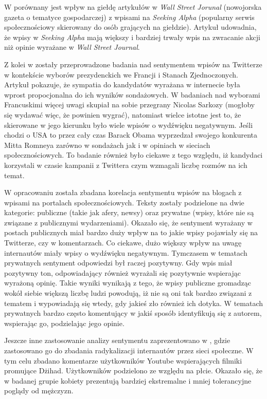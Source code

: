 W \cite{SentimentRevealedInSocialMedia} porównany jest wpływ na giełdę artykułów
w \textit{Wall Street Jorunal} (nowojorska gazeta o tematyce gospodarczej) z
wpisami na \textit{Seeking Alpha} (popularny serwis społecznościowy skierowany
do osób grających na giełdzie). Artykuł udowadnia, że wpisy w \textit{Seeking
Alpha} mają większy i bardziej trwały wpis na zwracanie akcji niż opinie
wyrażane w \textit{Wall Street Journal}.

Z kolei w \cite{PresidentialElectionsOnTwitter} zostały przeprowadzone badania
nad sentymentem wpisów na Twitterze w kontekście wyborów prezydenckich we
Francji i Stanach Zjednoczonych.
Artykuł pokazuje, że sympatia do kandydatów wyrażana w internecie była wprost
propocjonalna do ich wyników sondażowych. W badaniach nad wyborami Francuskimi
więcej uwagi skupiał na sobie przegrany Nicolas Sarkozy (mogłoby się wydawać
więc, że powinien wygrać), natomiast wielce istotne jest to, że skierowane w
jego kierunku było wiele wpisów o wydźwięku negatywnym. Jeśli chodzi o USA to
przez cały czas Barack Obama wyprzedzał swojego konkurenta Mitta Romneya zarówno
w sondażach jak i w opiniach w sieciach społecznościowych. To badanie również
było ciekawe z tego względu, iż kandydaci korzystali w czasie kampanii z
Twittera czym wzmagali liczbę rozmów na ich temat.

W opracowaniu \cite{AnalyzingSentimentialInfluenceOfPosts}
została zbadana korelacja sentymentu wpisów na blogach z wpisami na portalach
społecznościowych. Teksty zostały podzielone na dwie kategorie:
publiczne (takie jak afery, newsy) oraz prywatne (wpisy, które nie są związane z
publicznymi wydarzeniami). Okazało się, że sentyment wyrażany w postach
publicznych miał bardzo duży wpływ na to jakie wpisy pojawiały się na Twitterze,
czy w komentarzach. Co ciekawe, dużo większy wpływ na uwagę internautów miały
wpisy o wydźwięku negatywnym. Tymczasem w tematach prywatnych sentyment
odpowiedzi był raczej pozytywny. Gdy wpis miał pozytywny ton, odpowiadający
również wyrażali się pozytywnie wspierając wyrażoną opinię.
Takie wyniki wynikają z tego, że wpisy publiczne gromadząc wokół siebie większą
liczbę ludzi powodują, iż nie są oni tak bardzo związani z tematem i wypowiadają
się wtedy, gdy jakieś zło również ich dotyka. W tematach prywatnych bardzo
często komentujący w jakiś sposób identyfikują się z autorem, wspierając go,
podzielając jego opinie.

Jeszcze inne zastosowanie analizy sentymentu zaprezentowano w
\cite{CombiningSocialNetworkAnalysis}, gdzie zastosowano go do zbadania
radykalizacji internautów przez sieci społeczne. W tym celu zbadano komentarze
użytkowników Youtube wspierających filmiki promujące Dżihad. Użytkowników
podzielono ze względu na płcie. Okazało się, że w badanej grupie kobiety
prezentują bardziej ekstremalne i mniej tolerancyjne poglądy od mężczyzn.

